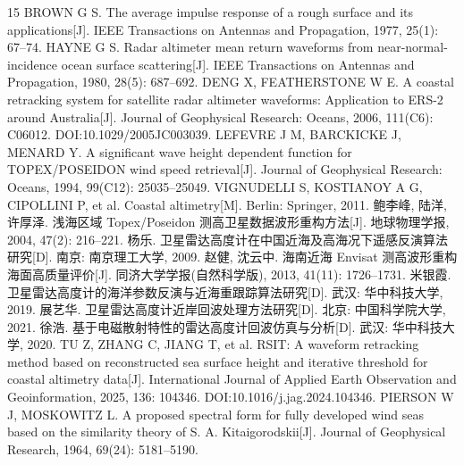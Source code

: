 \documentclass[a4paper]{article}
\begin{document}
\clearpage
\begin{thebibliography}{15}
  \setlength{\itemsep}{0pt}
  \setlength{\parskip}{0pt}
  \fontsize{10.5bp}{13.5bp}\selectfont
   BROWN G S. The average impulse response of a rough surface and its applications[J]. IEEE Transactions on Antennas and Propagation, 1977, 25(1): 67--74.
   HAYNE G S. Radar altimeter mean return waveforms from near-normal-incidence ocean surface scattering[J]. IEEE Transactions on Antennas and Propagation, 1980, 28(5): 687--692.
   DENG X, FEATHERSTONE W E. A coastal retracking system for satellite radar altimeter waveforms: Application to ERS-2 around Australia[J]. Journal of Geophysical Research: Oceans, 2006, 111(C6): C06012. DOI:10.1029/2005JC003039.
   LEFEVRE J M, BARCKICKE J, MENARD Y. A significant wave height dependent function for TOPEX/POSEIDON wind speed retrieval[J]. Journal of Geophysical Research: Oceans, 1994, 99(C12): 25035--25049.
   VIGNUDELLI S, KOSTIANOY A G, CIPOLLINI P, et al. Coastal altimetry[M]. Berlin: Springer, 2011.
   鲍李峰, 陆洋, 许厚泽. 浅海区域 Topex/Poseidon 测高卫星数据波形重构方法[J]. 地球物理学报, 2004, 47(2): 216--221.
   杨乐. 卫星雷达高度计在中国近海及高海况下遥感反演算法研究[D]. 南京: 南京理工大学, 2009.
   赵健, 沈云中. 海南近海 Envisat 测高波形重构海面高质量评价[J]. 同济大学学报(自然科学版), 2013, 41(11): 1726--1731.
   米银霞. 卫星雷达高度计的海洋参数反演与近海重跟踪算法研究[D]. 武汉: 华中科技大学, 2019.
   展艺华. 卫星雷达高度计近岸回波处理方法研究[D]. 北京: 中国科学院大学, 2021.
   徐浩. 基于电磁散射特性的雷达高度计回波仿真与分析[D]. 武汉: 华中科技大学, 2020.
   TU Z, ZHANG C, JIANG T, et al. RSIT: A waveform retracking method based on reconstructed sea surface height and iterative threshold for coastal altimetry data[J]. International Journal of Applied Earth Observation and Geoinformation, 2025, 136: 104346. DOI:10.1016/j.jag.2024.104346.
   PIERSON W J, MOSKOWITZ L. A proposed spectral form for fully developed wind seas based on the similarity theory of S. A. Kitaigorodskii[J]. Journal of Geophysical Research, 1964, 69(24): 5181--5190.
\end{thebibliography}
\end{document}
